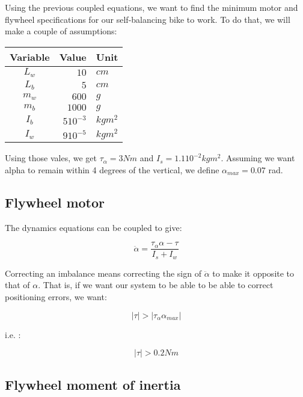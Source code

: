 \documentclass[11pt]{article}
\begin{document}
Using the previous coupled equations, we want to find the minimum motor and flywheel specifications for our self-balancing bike to work. To do that, we will make a couple of assumptions:

\begin{center}
\begin{tabular}{|c|rl|}
\hline
Variable & Value & Unit \\
\hline
\hline

$L_w$ & $10$ & $cm$ \\
$L_b$ & $5$ & $cm$ \\
$m_w$ & $600$ & $g$ \\
$m_b$ & $1000$ & $g$ \\
$I_b$ & $5 10^{-3}$ & $kgm^2$ \\
$I_w$ & $9 10^{-5}$ & $kgm^2$ \\
\hline
\end{tabular}
\end{center}

Using those vales, we get $\tau_\alpha = 3 Nm$ and $I_s = 1.1 10^{-2} kgm^2$. Assuming we want alpha to remain within 4 degrees of the vertical, we define $\alpha_{max} = 0.07$ rad.

\subsection{Flywheel motor}

The dynamics equations can be coupled to give:

$$\ddot{\alpha} = \frac{\tau_\alpha \alpha - \tau}{I_s + I_w}$$

Correcting an imbalance means correcting the sign of $\ddot{\alpha}$ to make it opposite to that of $\alpha$. That is, if we want our system to be able to be able to correct positioning errors, we want:

$$|\tau| > |\tau_\alpha \alpha_{max}|$$

i.e. :

$$|\tau| > 0.2 Nm$$


\subsection{Flywheel moment of inertia}
\end{document}
